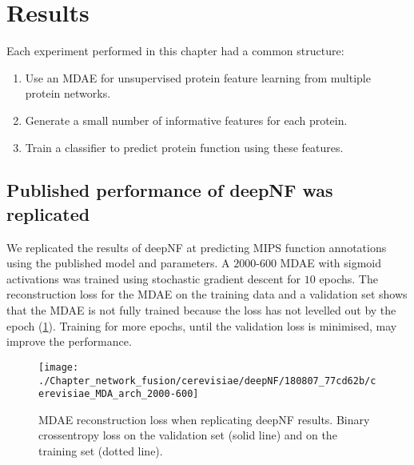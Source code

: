 \section{Results}

Each experiment performed in this chapter had a common structure:

\begin{enumerate}
    \item Use an MDAE for unsupervised protein feature learning from multiple protein networks.
    \item Generate a small number of informative features for each protein.
    \item Train a classifier to predict protein function using these features.
\end{enumerate}

\subsection{Published performance of deepNF was replicated}
\label{replicate-deepnf-results}

We replicated the results of deepNF at predicting MIPS function annotations using the published model and parameters.
A $2000$-$600$ MDAE with sigmoid activations was trained using stochastic gradient descent for $10$ epochs.
The reconstruction loss for the MDAE on the training data and a validation set shows that the MDAE is not fully trained because the loss has not levelled out by the  epoch (\ref{fig:replicate-deepNF-loss}).
Training for more epochs, until the validation loss is minimised, may improve the performance.


\begin{figure}[!hbt]
    \centering
    \texttt{[image: ./Chapter\_network\_fusion/cerevisiae/deepNF/180807\_77cd62b/cerevisiae\_MDA\_arch\_2000-600]}
    \caption{%
        MDAE reconstruction loss when replicating deepNF results.
        Binary crossentropy loss on the validation set (solid line) and on the training set (dotted line).
    }
    \label{fig:replicate-deepNF-loss}
\end{figure}

